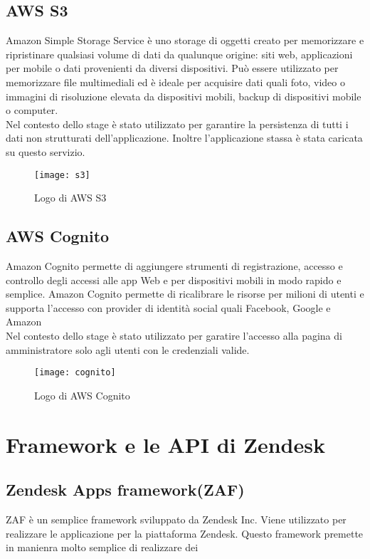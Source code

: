 \subsection{AWS S3} 
Amazon Simple Storage Service è uno storage di
oggetti creato per memorizzare e ripristinare qualsiasi volume di dati da qualunque
origine: siti web, applicazioni per mobile o dati provenienti da diversi dispositivi. Può
essere utilizzato per memorizzare file multimediali ed è ideale per acquisire dati quali
foto, video o immagini di risoluzione elevata da dispositivi mobili, backup di dispositivi
mobile o computer.
\\

Nel contesto dello stage è stato utilizzato per garantire la persistenza di tutti i dati
non strutturati dell’applicazione. Inoltre l'applicazione stassa è stata caricata su questo servizio.   
\begin{figure}[!h] 
	\centering 
	\texttt{[image: s3]}
	\caption{Logo di AWS S3}
\end{figure}

\subsection{AWS Cognito} 
Amazon Cognito permette di aggiungere strumenti di registrazione, accesso e controllo degli accessi alle app Web e per dispositivi mobili in modo rapido e semplice. Amazon Cognito permette di ricalibrare le risorse per milioni di utenti e supporta l'accesso con provider di identità social quali Facebook, Google e Amazon 
\\

Nel contesto dello stage è stato utilizzato per garatire l'accesso alla pagina di amministratore solo agli utenti con le credenziali valide.   
\begin{figure}[!h] 
	\centering 
	\texttt{[image: cognito]}
	\caption{Logo di AWS Cognito}
\end{figure}

\section{Framework e le API di Zendesk}

\subsection{Zendesk Apps framework(ZAF)}
ZAF è un semplice framework sviluppato da Zendesk Inc. Viene utilizzato per realizzare le applicazione per la piattaforma Zendesk. Questo framework premette in manienra molto semplice di realizzare dei


